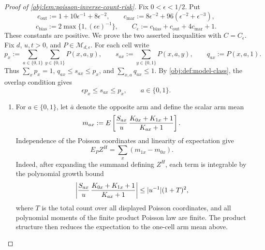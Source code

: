 \documentclass[11pt]{article}
\begin{document}
\begin{proof}[Proof of \cref{obj:lem:poisson-inverse-count-risk}]
Fix \(0<\epsilon<1/2\).  Put
\[
c_{\mathrm{out}}:=1+10\epsilon^{-1}+8\epsilon^{-2},\qquad
c_{\mathrm{mar}}:=8\epsilon^{-2}+96(\epsilon^{-2}+\epsilon^{-3}),
\]
\[
c_{\mathrm{bias}}:=2\max\{1,(\epsilon e)^{-1}\},
\qquad
C_\epsilon:=c_{\mathrm{bias}}+c_{\mathrm{out}}+4c_{\mathrm{mar}}+1 .
\]
These constants are positive.  We prove the two asserted inequalities with
\(C=C_\epsilon\).  Fix \(d\), \(u,t>0\), and \(P\in\mathcal M_{d,\epsilon}\).
For each cell write
\[
p_x:=\sum_{a\in\{0,1\}}\sum_{y\in\{0,1\}}P(x,a,y),
\qquad
s_{ax}:=\sum_{y\in\{0,1\}}P(x,a,y),
\qquad
q_{ax}:=P(x,a,1).
\]
Thus \(\sum_xp_x=1\), \(q_{ax}\le s_{ax}\le p_x\), and \(\sum_{x,a}q_{ax}\le1\).  By \cref{obj:def:model-class}, the overlap condition gives
\[
\epsilon p_x\le s_{ax}\le p_x,\qquad a\in\{0,1\}.
\]

\begin{enumerate}
\item
For \(a\in\{0,1\}\), let \(\bar a\) denote the opposite arm and define the scalar arm mean
\[
m_{ax}:=
E\left[
{S_{ax}\over u}\,
{K_{0x}+K_{1x}+1\over K_{ax}+1}
\right].
\]
Independence of the Poisson coordinates and linearity of expectation give
\[
E_P Z^H=\sum_x(m_{1x}-m_{0x}).
\]
Indeed, after expanding the summand defining \(Z^H\), each term is integrable by the polynomial growth bound
\[
\left|
{S_{ax}\over u}\,
{K_{0x}+K_{1x}+1\over K_{ax}+1}
\right|
\le
|u^{-1}|(1+T)^2 ,
\]
where \(T\) is the total count over all displayed Poisson coordinates, and all polynomial moments of the finite product Poisson law are finite.  The product structure then reduces the expectation to the one-cell arm mean above. %


\end{enumerate}
\end{proof}
\end{document}
